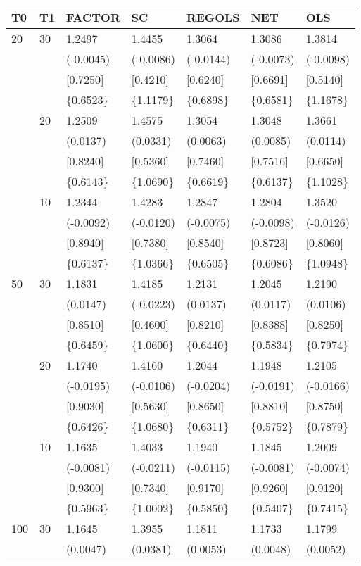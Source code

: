 \begin{table}[ht]
\centering
\begin{tabular}{lllllll}
\hline
T0&T1&FACTOR&SC&REGOLS&NET&OLS\\
\hline
20&30&1.2497&1.4455&1.3064&1.3086&1.3814\\
&&(-0.0045)&(-0.0086)&(-0.0144)&(-0.0073)&(-0.0098)\\
&&[0.7250]&[0.4210]&[0.6240]&[0.6691]&[0.5140]\\
&&\{0.6523\}&\{1.1179\}&\{0.6898\}&\{0.6581\}&\{1.1678\}\\
&20&1.2509&1.4575&1.3054&1.3048&1.3661\\
&&(0.0137)&(0.0331)&(0.0063)&(0.0085)&(0.0114)\\
&&[0.8240]&[0.5360]&[0.7460]&[0.7516]&[0.6650]\\
&&\{0.6143\}&\{1.0690\}&\{0.6619\}&\{0.6137\}&\{1.1028\}\\
&10&1.2344&1.4283&1.2847&1.2804&1.3520\\
&&(-0.0092)&(-0.0120)&(-0.0075)&(-0.0098)&(-0.0126)\\
&&[0.8940]&[0.7380]&[0.8540]&[0.8723]&[0.8060]\\
&&\{0.6137\}&\{1.0366\}&\{0.6505\}&\{0.6086\}&\{1.0948\}\\
50&30&1.1831&1.4185&1.2131&1.2045&1.2190\\
&&(0.0147)&(-0.0223)&(0.0137)&(0.0117)&(0.0106)\\
&&[0.8510]&[0.4600]&[0.8210]&[0.8388]&[0.8250]\\
&&\{0.6459\}&\{1.0600\}&\{0.6440\}&\{0.5834\}&\{0.7974\}\\
&20&1.1740&1.4160&1.2044&1.1948&1.2105\\
&&(-0.0195)&(-0.0106)&(-0.0204)&(-0.0191)&(-0.0166)\\
&&[0.9030]&[0.5630]&[0.8650]&[0.8810]&[0.8750]\\
&&\{0.6426\}&\{1.0680\}&\{0.6311\}&\{0.5752\}&\{0.7879\}\\
&10&1.1635&1.4033&1.1940&1.1845&1.2009\\
&&(-0.0081)&(-0.0211)&(-0.0115)&(-0.0081)&(-0.0074)\\
&&[0.9300]&[0.7340]&[0.9170]&[0.9260]&[0.9120]\\
&&\{0.5963\}&\{1.0002\}&\{0.5850\}&\{0.5407\}&\{0.7415\}\\
100&30&1.1645&1.3955&1.1811&1.1733&1.1799\\
&&(0.0047)&(0.0381)&(0.0053)&(0.0048)&(0.0052)\\

\end{tabular}
\end{table}
